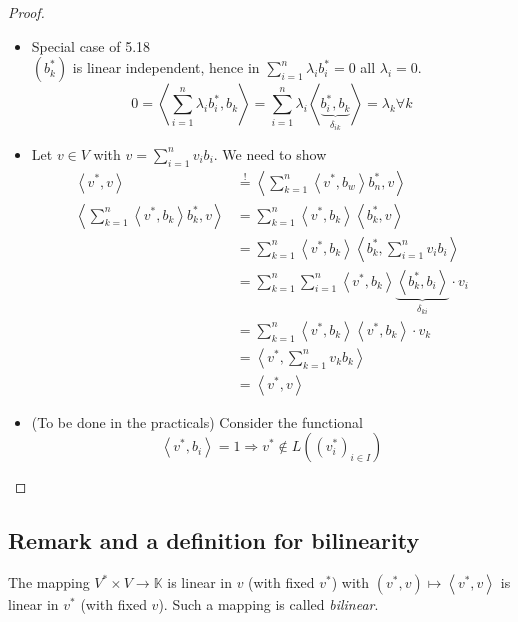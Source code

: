 \documentclass[a4paper,landscape,twocolumn]{article}
\newcommand\functional[1]{\left\langle{#1}\right\rangle}
\begin{document}
\begin{proof}
  \begin{itemize}
    \item Special case of 5.18 \\
      $(b^*_k)$ is linear independent, hence in $\sum_{i=1}^n \lambda_i b_i^* = 0$ all $\lambda_i = 0$.
      \[
        0 = \functional{\sum_{i=1}^n \lambda_i b_i^*, b_k}
          = \sum_{i=1}^n \lambda_i \functional{\underbrace{b_i^*, b_k}_{\delta_{ik}}}
          = \lambda_k \forall k
      \]
    \item Let $v \in V$ with $v = \sum_{i=1}^n v_i b_i$. We need to show
      \begin{align*}
        \functional{v^*, v} &\stackrel{!}{=} \functional{\sum_{k=1}^n \functional{v^*,b_w} b_n^*, v} \\
        \functional{\sum_{k=1}^n \functional{v^*, b_k} b_k^*, v}
            &= \sum_{k=1}^n \functional{v^*, b_k} \functional{b_k^*, v} \\
            &= \sum_{k=1}^n \functional{v^*, b_k} \functional{b_k^*, \sum_{i=1}^n v_i b_i} \\
            &= \sum_{k=1}^n \sum_{i=1}^n \functional{v^*, b_k} \underbrace{\functional{b_k^*, b_i}}_{\delta_{ki}} \cdot v_i \\
            &= \sum_{k=1}^n \functional{v^*, b_k} \functional{v^*, b_k} \cdot v_k \\
            &= \functional{v^*, \sum_{k=1}^n v_k b_k} \\
            &= \functional{v^*, v}
      \end{align*}
    \item (To be done in the practicals)
      Consider the functional
      \[ \functional{v^*, b_i} = 1 \Rightarrow v^* \not\in L((v_i^*)_{i \in I}) \]
  \end{itemize}
\end{proof}

\subsection{Remark and a definition for bilinearity}
%
The mapping $V^* \times V \to \mathbb K$ is linear in $v$ (with fixed $v^*$)
with $(v^*, v) \mapsto \functional{v^*, v}$ is linear in $v^*$ (with fixed $v$).
Such a mapping is called \emph{bilinear}.
\end{document}
